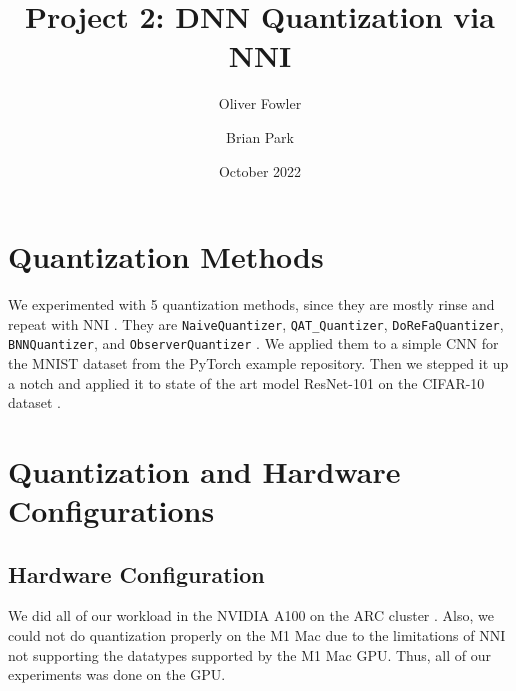 \documentclass{article}
\title{Project 2: DNN Quantization via NNI}
\author{Oliver Fowler}
\author{Brian Park}
\affil{North Carolina State University, Computer Science 591/791-025}
\date{October 2022}
\begin{document}
\maketitle

\section{Quantization Methods}
We experimented with 5 quantization methods, since they are mostly rinse and repeat with NNI \cite{nni}. They are \verb|NaiveQuantizer|, \verb|QAT_Quantizer|, \verb|DoReFaQuantizer|, \verb|BNNQuantizer|, and \verb|ObserverQuantizer| \cite{dorefa,binarynn,qat}. We applied them to a simple CNN for the MNIST dataset from the PyTorch example repository. Then we stepped it up a notch and applied it to state of the art model ResNet-101 on the CIFAR-10 dataset \cite{resnet}.


\section{Quantization and Hardware Configurations}
\subsection{Hardware Configuration}
We did all of our workload in the NVIDIA A100 on the ARC cluster \cite{arc}. Also, we could not do quantization properly on the M1 Mac due to the limitations of NNI not supporting the datatypes supported by the M1 Mac GPU. Thus, all of our experiments was done on the GPU.
\end{document}

